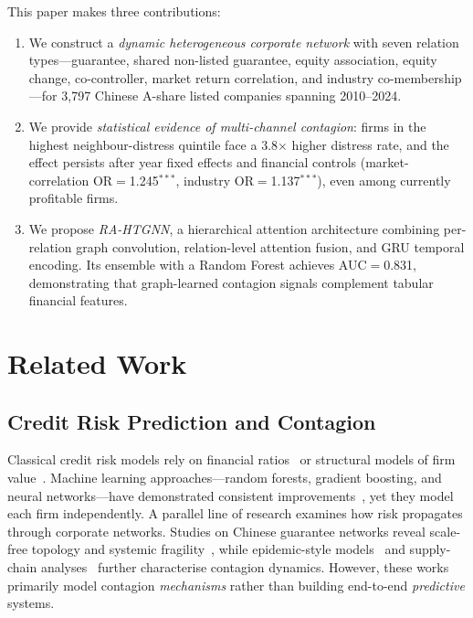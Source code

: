 \documentclass[3p,times,procedia]{elsarticle}
\begin{document}
This paper makes three contributions:
\begin{enumerate}
\item We construct a \emph{dynamic heterogeneous corporate network} with seven relation types---guarantee, shared non-listed guarantee, equity association, equity change, co-controller, market return correlation, and industry co-membership---for 3{,}797 Chinese A-share listed companies spanning 2010--2024.
\item We provide \emph{statistical evidence of multi-channel contagion}: firms in the highest neighbour-distress quintile face a 3.8$\times$ higher distress rate, and the effect persists after year fixed effects and financial controls (market-correlation OR$=$1.245$^{***}$, industry OR$=$1.137$^{***}$), even among currently profitable firms.
\item We propose \emph{RA-HTGNN}, a hierarchical attention architecture combining per-relation graph convolution, relation-level attention fusion, and GRU temporal encoding. Its ensemble with a Random Forest achieves AUC$=$0.831, demonstrating that graph-learned contagion signals complement tabular financial features.
\end{enumerate}


\section{Related Work}
\label{sec:related}

\subsection{Credit Risk Prediction and Contagion}
\label{subsec:credit_risk}

Classical credit risk models rely on financial ratios~\cite{altman1968financial, ohlson1980financial} or structural models of firm value~\cite{merton1974pricing}.
Machine learning approaches---random forests, gradient boosting, and neural networks---have demonstrated consistent improvements~\cite{barboza2017machine, moscatelli2020corporate}, yet they model each firm independently.
A parallel line of research examines how risk propagates through corporate networks.
Studies on Chinese guarantee networks reveal scale-free topology and systemic fragility~\cite{niu2020guarantee, lv2023guarantee}, while epidemic-style models~\cite{ma2022credit} and supply-chain analyses~\cite{li2024credit, chen2024supply} further characterise contagion dynamics.
However, these works primarily model contagion \emph{mechanisms} rather than building end-to-end \emph{predictive} systems.
\end{document}
